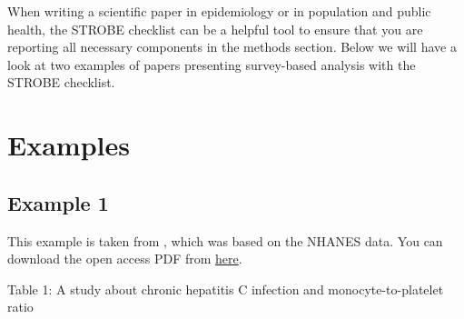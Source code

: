 \documentclass[
]{book}
\begin{document}
When writing a scientific paper in epidemiology or in population and public health, the STROBE checklist \citep{von2007strengthening} can be a helpful tool to ensure that you are reporting all necessary components in the methods section. Below we will have a look at two examples of papers presenting survey-based analysis with the STROBE checklist.

\hypertarget{examples-1}{%
\section{Examples}\label{examples-1}}

\hypertarget{example-1-1}{%
\subsection{Example 1}\label{example-1-1}}

This example is taken from \citet{nikiforuk2021influence}, which was based on the NHANES data. You can download the open access PDF from \href{https://www.ncbi.nlm.nih.gov/pmc/articles/PMC8278694/pdf/12889_2021_Article_11267.pdf}{here}.

Table 1: A study about chronic hepatitis C infection and monocyte-to-platelet ratio \citep{nikiforuk2021influence}
\end{document}
